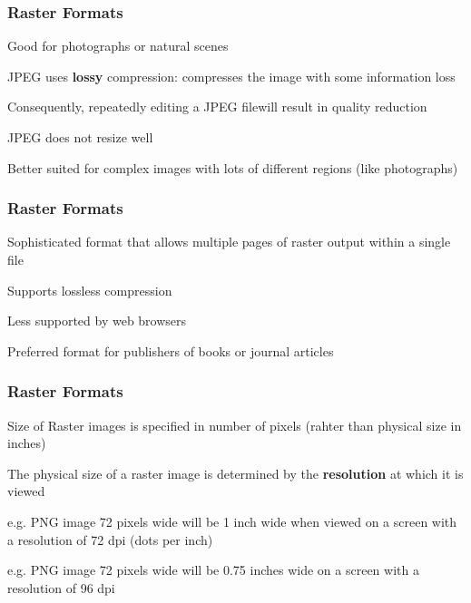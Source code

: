 \documentclass[12pt]{beamer}\usepackage[]{graphicx}\usepackage[]{color}
\begin{document}
\begin{frame}
\frametitle{Raster Formats}

\bi
  \item Good for photographs or natural scenes
  \item JPEG uses \textbf{lossy} compression: compresses the image with some information loss
  \item Consequently, repeatedly editing a JPEG filewill result in quality reduction
  \item JPEG does not resize well
  \item Better suited for complex images with lots of different regions (like photographs)
\ei
\eb

\end{frame}


\begin{frame}
\frametitle{Raster Formats}

\bi
  \item Sophisticated format that allows multiple pages of raster output within a single file
  \item Supports lossless compression
  \item Less supported by web browsers
  \item Preferred format for publishers of books or journal articles
\ei
\eb

\end{frame}


\begin{frame}
\frametitle{Raster Formats}

\bi
  \item Size of Raster images is specified in number of pixels (rahter than physical size in inches)
  \item The physical size of a raster image is determined by the \textbf{resolution} at which it is viewed
  \item e.g. PNG image 72 pixels wide will be 1 inch wide when viewed on a screen with a resolution of 72 dpi (dots per inch)
  \item e.g. PNG image 72 pixels wide will be 0.75 inches wide on a screen with a resolution of 96 dpi
\ei
\eb

\end{frame}

\end{document}
